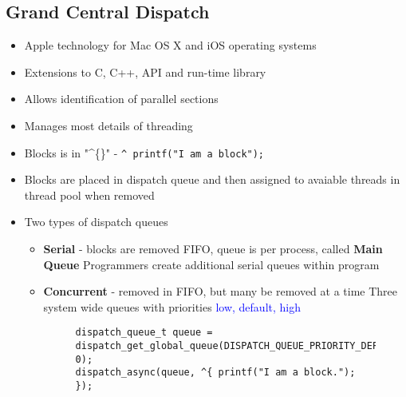 \documentclass[oneside]{book}
\begin{document}
            \subsection{Grand Central Dispatch}
                \begin{itemize}
                    \item Apple technology for Mac OS X and iOS operating systems
                    \item Extensions to C, C++, API and run-time library
                    \item Allows identification of parallel sections
                    \item Manages most details of threading
                    \item Blocks is in "\textasciicircum\{\}" - \texttt{^{ printf("I am a block"); }}
                    \item Blocks are placed in dispatch queue and then assigned to avaiable threads in thread pool when removed
                    \item Two types of dispatch queues
                        \begin{itemize}
                            \item \textbf{Serial} - blocks are removed FIFO, queue is per process, called \textbf{Main Queue}
                                \subitem Programmers create additional serial queues within program
                            \item \textbf{Concurrent} - removed in FIFO, but many be removed at a time
                                \subitem Three system wide queues with priorities \textcolor{blue}{low, default, high}
                                \begin{figure}[H]
                                    \begin{flushleft}
                                        \begin{verbatim}
dispatch_queue_t queue = dispatch_get_global_queue(DISPATCH_QUEUE_PRIORITY_DEFAULT, 0);
dispatch_async(queue, ^{ printf("I am a block."); });
                                        \end{verbatim}
                                    \end{flushleft}
                                \end{figure}
                        \end{itemize}
                \end{itemize}
\end{document}
